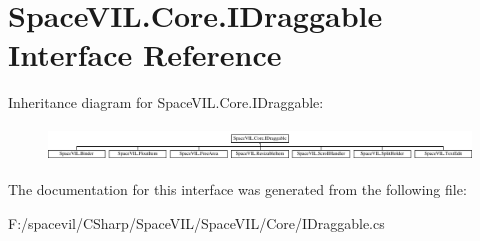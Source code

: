 \hypertarget{interface_space_v_i_l_1_1_core_1_1_i_draggable}{}\section{Space\+V\+I\+L.\+Core.\+I\+Draggable Interface Reference}
\label{interface_space_v_i_l_1_1_core_1_1_i_draggable}
Inheritance diagram for Space\+V\+I\+L.\+Core.\+I\+Draggable\+:\begin{figure}[H]
\begin{center}
\leavevmode
\includegraphics[height=0.924856cm]{interface_space_v_i_l_1_1_core_1_1_i_draggable}
\end{center}
\end{figure}


The documentation for this interface was generated from the following file\+:\begin{DoxyCompactItemize}
\item 
F\+:/spacevil/\+C\+Sharp/\+Space\+V\+I\+L/\+Space\+V\+I\+L/\+Core/I\+Draggable.\+cs\end{DoxyCompactItemize}
